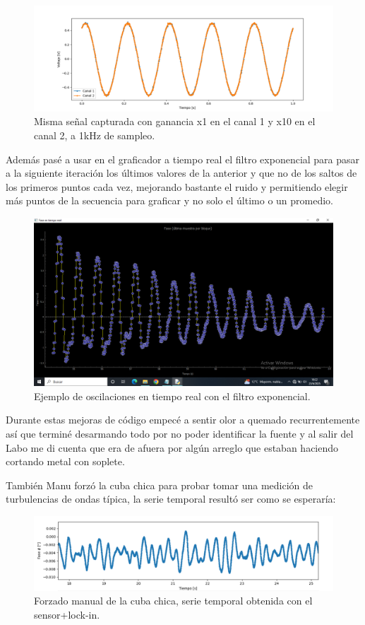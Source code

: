 \begin{figure}[th!]
	\centering
	\includegraphics[width=0.87\linewidth]{Figures/23_06_2025/Ganancia_x10_canal2}
	\caption{Misma señal capturada con ganancia x1 en el canal 1 y x10 en el canal 2, a 1kHz de sampleo.}
	\label{fig:gananciax10canal2}
\end{figure}


Además pasé a usar en el graficador a tiempo real el filtro exponencial para pasar a la siguiente iteración los últimos valores de la anterior y que no de los saltos de los primeros puntos cada vez, mejorando bastante el ruido y permitiendo elegir más puntos de la secuencia para graficar y no solo el último o un promedio.

\begin{figure}[th!]
	\centering
	\includegraphics[width=0.567\linewidth]{Figures/23_06_2025/Mejor_tiempo_real}
	\caption{Ejemplo de oscilaciones en tiempo real con el filtro exponencial.}
	\label{fig:mejortiemporeal}
\end{figure}

Durante estas mejoras de código empecé a sentir olor a quemado recurrentemente así que terminé desarmando todo por no poder identificar la fuente y al salir del Labo me di cuenta que era de afuera por algún arreglo que estaban haciendo cortando metal con soplete. 

También Manu forzó la cuba chica para probar tomar una medición de turbulencias de ondas típica, la serie temporal resultó ser como se esperaría:

\begin{figure}[th!]
	\centering
	\includegraphics[width=0.87\linewidth]{Figures/23_06_2025/Forzado_Manu_Lunes}
	\caption{Forzado manual de la cuba chica, serie temporal obtenida con el sensor+lock-in.}
	\label{fig:forzadomanulunes}
\end{figure}

